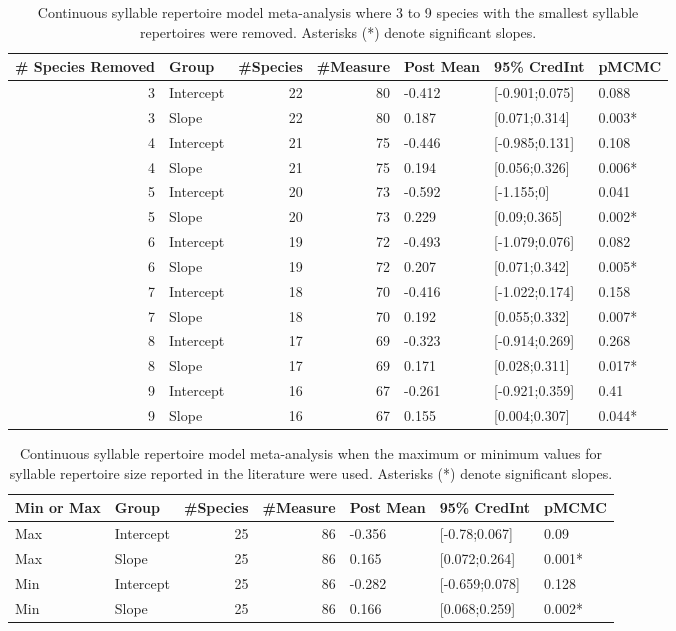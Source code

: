\documentclass{article}
\begin{document}
  \begin{table}[H]
  \centering
  \caption{Continuous syllable repertoire model meta-analysis where 3 to 9 species with the smallest syllable repertoires were removed.  Asterisks (*) denote significant slopes.} 
  \begin{tabular}{rlrrlll}
  \hline
  \# Species Removed & Group & \#Species & \#Measure & Post Mean & 95\% CredInt & pMCMC \\ 
  \hline
  3 & Intercept &  22 &  80 & -0.412 & [-0.901;0.075] & 0.088 \\ 
  3 & Slope &  22 &  80 & 0.187 & [0.071;0.314] & 0.003* \\ 
  4 & Intercept &  21 &  75 & -0.446 & [-0.985;0.131] & 0.108 \\ 
  4 & Slope &  21 &  75 & 0.194 & [0.056;0.326] & 0.006* \\ 
  5 & Intercept &  20 &  73 & -0.592 & [-1.155;0] & 0.041 \\ 
  5 & Slope &  20 &  73 & 0.229 & [0.09;0.365] & 0.002* \\ 
  6 & Intercept &  19 &  72 & -0.493 & [-1.079;0.076] & 0.082 \\ 
  6 & Slope &  19 &  72 & 0.207 & [0.071;0.342] & 0.005* \\ 
  7 & Intercept &  18 &  70 & -0.416 & [-1.022;0.174] & 0.158 \\ 
  7 & Slope &  18 &  70 & 0.192 & [0.055;0.332] & 0.007* \\ 
  8 & Intercept &  17 &  69 & -0.323 & [-0.914;0.269] & 0.268 \\ 
  8 & Slope &  17 &  69 & 0.171 & [0.028;0.311] & 0.017* \\ 
  9 & Intercept &  16 &  67 & -0.261 & [-0.921;0.359] & 0.41 \\ 
  9 & Slope &  16 &  67 & 0.155 & [0.004;0.307] & 0.044* \\ 
  \hline
  \end{tabular}
  \end{table}
  
  \begin{table}[H]
  \centering
  \caption{Continuous syllable repertoire model meta-analysis when the maximum or minimum values for syllable repertoire size reported in the literature were used.  Asterisks (*) denote significant slopes.} 
  \begin{tabular}{llrrlll}
  \hline
  Min or Max & Group & \#Species & \#Measure & Post Mean & 95\% CredInt & pMCMC \\ 
  \hline
  Max & Intercept &  25 &  86 & -0.356 & [-0.78;0.067] & 0.09 \\ 
  Max & Slope &  25 &  86 & 0.165 & [0.072;0.264] & 0.001* \\ 
  Min & Intercept &  25 &  86 & -0.282 & [-0.659;0.078] & 0.128 \\ 
  Min & Slope &  25 &  86 & 0.166 & [0.068;0.259] & 0.002* \\ 
  \hline
  \end{tabular}
  \end{table}
  
\end{document}
